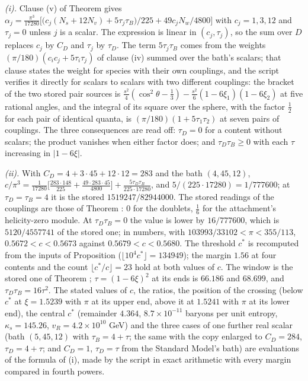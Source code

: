 \emph{(i).} Clause (v) of Theorem  gives $\alpha_{j} = \tfrac{\pi^{3}}{17280}\bigl[\bigl(c_{j}(N_{s} + 12N_{v}) + 5\tau_{j}\tau_{B}\bigr)/225 + 49c_{j}N_{w}/4800\bigr]$ with $c_{j} = 1, 3, 12$ and $\tau_{j} = 0$ unless $j$ is a scalar. The expression is linear in $(c_{j}, \tau_{j})$, so the sum over $D$ replaces $c_{j}$ by $C_{D}$ and $\tau_{j}$ by $\tau_{D}$. The term $5\tau_{j}\tau_{B}$ comes from the weights $(\pi/180)(c_{i}c_{j} + 5\tau_{i}\tau_{j})$ of clause (iv) summed over the bath's scalars; that clause states the weight for species with their own couplings, and the script verifies it directly for scalars to scalars with two different couplings: the bracket of the two stored pair sources is $\tfrac{s^{2}}{4}(\cos^{2}\theta - \tfrac13) - \tfrac{s^{2}}{6}(1 - 6\xi_{1})(1 - 6\xi_{2})$ at five rational angles, and the integral of its square over the sphere, with the factor $\tfrac12$ for each pair of identical quanta, is $(\pi/180)(1 + 5\tau_{1}\tau_{2})$ at seven pairs of couplings. The three consequences are read off: $\tau_{D} = 0$ for a content without scalars; the product vanishes when either factor does; and $\tau_{D}\tau_{B} \ge 0$ with each $\tau$ increasing in $|1 - 6\xi|$.

\emph{(ii).} With $C_{D} = 4 + 3 \cdot 45 + 12 \cdot 12 = 283$ and the bath $(4, 45, 12)$, $c/\pi^{3} = \tfrac{1}{17280}\bigl[\tfrac{283 \cdot 148}{225} + \tfrac{49 \cdot 283 \cdot 45}{4800}\bigr] + \tfrac{5\tau_{D}\tau_{B}}{225 \cdot 17280}$, and $5/(225 \cdot 17280) = 1/777600$; at $\tau_{D} = \tau_{B} = 4$ it is the stored $1519247/82944000$. The stored readings of the couplings are those of Theorem : $0$ for the doublets, $\tfrac16$ for the attachment's helicity-zero module. At $\tau_{D}\tau_{B} = 0$ the value is lower by $16/777600$, which is $5120/4557741$ of the stored one; in numbers, with $103993/33102 < \pi < 355/113$, $0.5672 < c < 0.5673$ against $0.5679 < c < 0.5680$. The threshold $c^{*}$ is recomputed from the inputs of Proposition  ($\lfloor 10^{4}c^{*} \rfloor = 134949$); the margin $1.56$ at four contents and the count $\lfloor c^{*}/c \rfloor = 23$ hold at both values of $c$. The window is the stored one of Theorem ; $\tau = (1 - 6\xi)^{2}$ at its ends is $66.186$ and $68.699$, and $\tau_{D}\tau_{B} = 16\tau^{2}$. The stated values of $c$, the ratios, the position of the crossing (below $c^{*}$ at $\xi = 1.5239$ with $\pi$ at its upper end, above it at $1.5241$ with $\pi$ at its lower end), the central $c^{*}$ (remainder $4.364$, $8.7 \times 10^{-11}$ baryons per unit entropy, $\kappa_{s} = 145.26$, $v_{R} = 4.2 \times 10^{10}$ GeV) and the three cases of one further real scalar (bath $(5, 45, 12)$ with $\tau_{B} = 4 + \tau$; the same with the copy enlarged to $C_{D} = 284$, $\tau_{D} = 4 + \tau$; and $C_{D} = 1$, $\tau_{D} = \tau$ from the Standard Model's bath) are evaluations of the formula of (i), made by the script in exact arithmetic with every margin compared in fourth powers.

